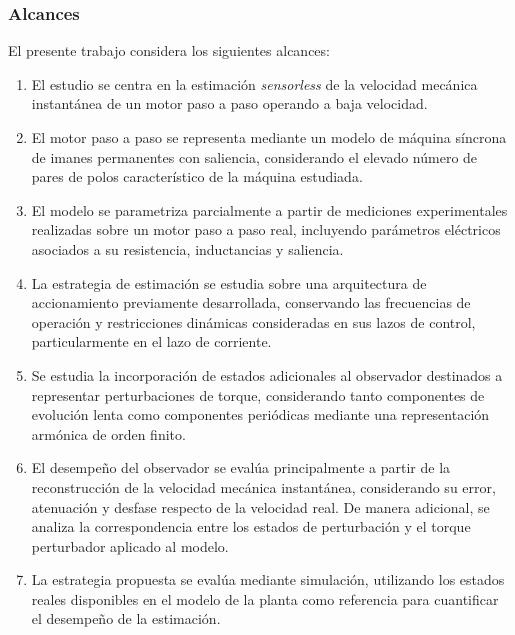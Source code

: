 \subsubsection{Alcances}

El presente trabajo considera los siguientes alcances:

\begin{enumerate}

    \item El estudio se centra en la estimación \textit{sensorless} de la
    velocidad mecánica instantánea de un motor paso a paso operando a baja
    velocidad.

    \item El motor paso a paso se representa mediante un modelo de máquina
    síncrona de imanes permanentes con saliencia, considerando el elevado
    número de pares de polos característico de la máquina estudiada.

    \item El modelo se parametriza parcialmente a partir de mediciones
    experimentales realizadas sobre un motor paso a paso real, incluyendo
    parámetros eléctricos asociados a su resistencia, inductancias y
    saliencia.

    \item La estrategia de estimación se estudia sobre una arquitectura de
    accionamiento previamente desarrollada, conservando las frecuencias de
    operación y restricciones dinámicas consideradas en sus lazos de control,
    particularmente en el lazo de corriente.

    \item Se estudia la incorporación de estados adicionales al observador
    destinados a representar perturbaciones de torque, considerando tanto
    componentes de evolución lenta como componentes periódicas mediante una
    representación armónica de orden finito.

    \item El desempeño del observador se evalúa principalmente a partir de la
    reconstrucción de la velocidad mecánica instantánea, considerando su error,
    atenuación y desfase respecto de la velocidad real. De manera adicional,
    se analiza la correspondencia entre los estados de perturbación y el torque
    perturbador aplicado al modelo.

    \item La estrategia propuesta se evalúa mediante simulación, utilizando los
    estados reales disponibles en el modelo de la planta como referencia para
    cuantificar el desempeño de la estimación.

\end{enumerate}


